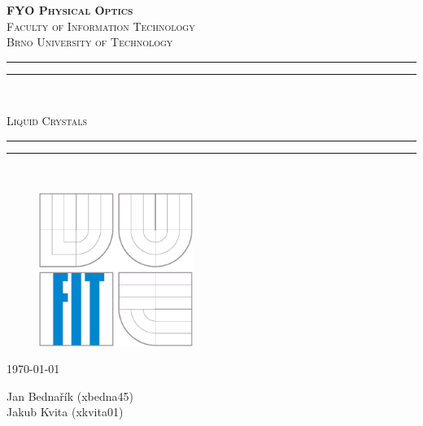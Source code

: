 \begin{titlepage}

\centering

\vspace*{\baselineskip} %
\textsc{\textbf{FYO Physical Optics} \\
Faculty of Information Technology\\
Brno University of Technology\\[10px]
} %


\rule{\textwidth}{1.6pt}\vspace*{-\baselineskip}\vspace*{2pt} %
\rule{\textwidth}{0.4pt}\\[\baselineskip] %

\begin{Huge}
\textsc{Liquid Crystals}\\[0.3\baselineskip]
\end{Huge}

\rule{\textwidth}{0.4pt}\vspace*{-\baselineskip}\vspace{3.2pt} %
\rule{\textwidth}{1.6pt}\\[\baselineskip] %


\vfill
\begin{figure}[!h]
  \centering
  \includegraphics[height=5cm]{img/logo.eps}
\end{figure}

\bigskip



\vfill

\begin{Large}
\today
\end{Large}


\vfill

\begin{flushleft}

\centering

\begin{large}
Jan Bednařík (xbedna45)\\
Jakub Kvita (xkvita01)\\
\end{large}

\vfill

\end{flushleft}
\end{titlepage}
